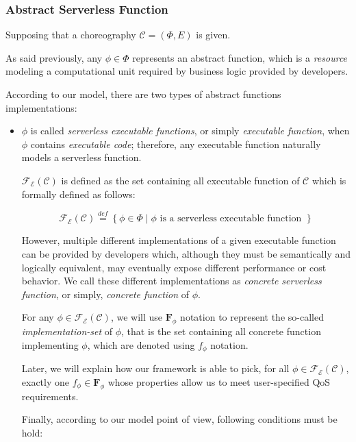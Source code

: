 \documentclass[12pt,a4paper]{report}
\newcommand{\mathDef}{\overset{\textit{def}}{=}}
\begin{document}
\subsubsection{Abstract Serverless Function}

Supposing that a choreography $\mathcal{C} = (\Phi,E)$ is given.

As said previously, any $\phi \in \Phi$ represents an abstract function, which is a \textit{resource} modeling a computational unit required by business logic provided by developers.

According to our model, there are two types of abstract functions implementations:

\begin{itemize}
	
	\item $\phi$ is called \textit{serverless executable functions}, or simply \textit{executable function}, when $\phi$ contains \textit{executable code}; therefore, any executable function naturally models a serverless function.
	
	$\mathscr{F_E}(\mathcal{C})$ is defined as the set containing all executable function of $\mathcal{C}$ which is formally defined as follows:
	
	\begin{equation}
		\mathscr{F_E(\mathcal{C})} \mathDef \left\lbrace \phi \in \Phi \mid \phi \text{ is a serverless executable function }\right\rbrace 
	\end{equation}
	
	However, multiple different implementations of a given executable function can be provided by developers which, although they must be semantically and logically equivalent, may eventually expose different performance or cost behavior. We call these different implementations as \textit{concrete serverless function}, or simply, \textit{concrete function} of $\phi$.
	
	For any $\phi \in \mathscr{F_E}(\mathcal{C})$, we will use $\textbf{F}_{\phi}$ notation to represent the so-called \textit{implementation-set} of $\phi$, that is the set containing all concrete function implementing $\phi$, which are denoted using $f_{\phi}$ notation. 

	Later, we will explain how our framework is able to pick, for all $\phi \in \mathscr{F_E}(\mathcal{C})$, exactly one $f_{\phi} \in \textbf{F}_{\phi}$ whose properties allow us to meet user-specified QoS requirements.
	
	Finally, according to our model point of view, following conditions must be hold: 
	

\end{itemize}
\end{document}

